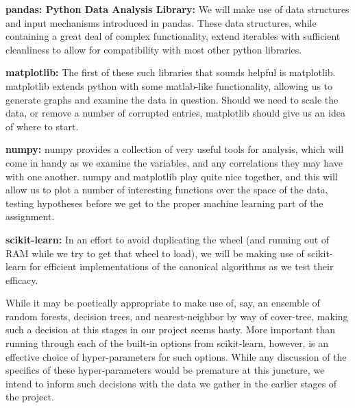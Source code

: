 \documentclass[10pt,a4paper]{article}
\begin{document}
\textbf{pandas: Python Data Analysis Library:}
We will make use of data structures and input mechanisms introduced in 
pandas.  These data structures, while containing a great deal of 
complex functionality, extend iterables with sufficient cleanliness to 
allow for compatibility with most other python libraries.

\textbf{matplotlib:} 
The first of these such libraries that sounds helpful is matplotlib.  
matplotlib extends python with some matlab-like functionality, allowing 
us to generate graphs and examine the data in question.  Should we need 
to scale the data, or remove a number of corrupted entries, matplotlib 
should give us an idea of where to start.

\textbf{numpy:}
numpy provides a collection of very useful tools for analysis, which 
will come in handy as we examine the variables, and any correlations 
they may have with one another.  numpy and matplotlib play quite nice 
together, and this will allow us to plot a number of interesting 
functions over the space of the data, testing hypotheses before we get 
to the proper machine learning part of the assignment.

\textbf{scikit-learn:}
In an effort to avoid duplicating the wheel (and running out of RAM 
while we try to get that wheel to load), we will be making use of 
scikit-learn for efficient implementations of the canonical algorithms 
as we test their efficacy.

While it may be poetically appropriate to make use of, say, an ensemble
of random forests, decision trees, and nearest-neighbor by way of
cover-tree, making such a decision at this stages in our project seems 
hasty.
More important than running through each of the built-in options from 
scikit-learn, however, is an effective choice of hyper-parameters for 
such options.  While any discussion of the specifics of these 
hyper-parameters would be premature at this juncture, we intend to 
inform such decisions with the data we gather in the earlier stages 
of the project.
\end{document}
